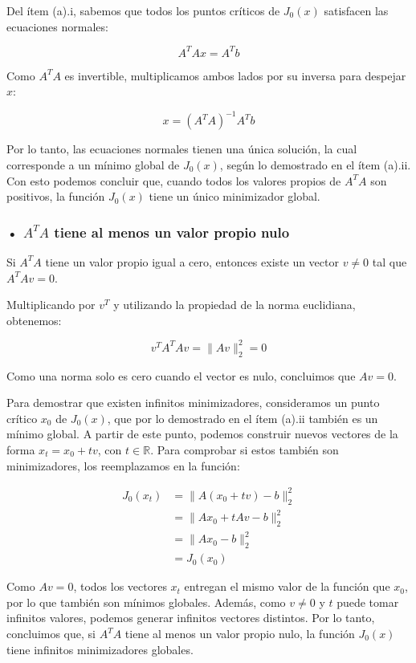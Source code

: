 \documentclass{article}
\begin{document}
\begin{enumerate}[label=\roman*., widest=iii]
  Del ítem (a).i, sabemos que todos los puntos críticos de \(J_0(x)\) satisfacen las ecuaciones normales:

  \[
  A^TAx=A^Tb
  \]

  Como \(A^TA\) es invertible, multiplicamos ambos lados por su inversa para despejar \(x\):

  \[
  \boxed{x=(A^TA)^{-1}A^Tb}
  \]

  Por lo tanto, las ecuaciones normales tienen una única solución, la cual corresponde a un mínimo global de \(J_0(x)\), según lo demostrado en el ítem (a).ii. Con esto podemos concluir que, cuando todos los valores propios de \(A^TA\) son positivos, la función \(J_0(x)\) tiene un único minimizador global.

  \bigskip

  \subsubsection*{• \(A^TA\) tiene al menos un valor propio nulo}

  Si \(A^TA\) tiene un valor propio igual a cero, entonces existe un vector \(v\neq 0\) tal que \(A^TAv=0\).

  Multiplicando por \(v^T\) y utilizando la propiedad de la norma euclidiana, obtenemos:

  \[
  v^TA^TAv=\|Av\|_2^2=0
  \]

  Como una norma solo es cero cuando el vector es nulo, concluimos que \(Av=0\).

  Para demostrar que existen infinitos minimizadores, consideramos un punto crítico \(x_0\) de \(J_0(x)\), que por lo demostrado en el ítem (a).ii también es un mínimo global. A partir de este punto, podemos construir nuevos vectores de la forma \(x_t=x_0+tv\), con \(t\in\mathbb{R}\). Para comprobar si estos también son minimizadores, los reemplazamos en la función:

  \[
  \begin{aligned}
  J_0(x_t)
  &=\|A(x_0+tv)-b\|_2^2\\
  &=\|Ax_0+tAv-b\|_2^2\\
  &=\|Ax_0-b\|_2^2\\
  &=J_0(x_0)
  \end{aligned}
  \]

  Como \(Av=0\), todos los vectores \(x_t\) entregan el mismo valor de la función que \(x_0\), por lo que también son mínimos globales. Además, como \(v\neq 0\) y \(t\) puede tomar infinitos valores, podemos generar infinitos vectores distintos. Por lo tanto, concluimos que, si \(A^TA\) tiene al menos un valor propio nulo, la función \(J_0(x)\) tiene infinitos minimizadores globales.
\end{enumerate}
\despueslista
\end{document}
